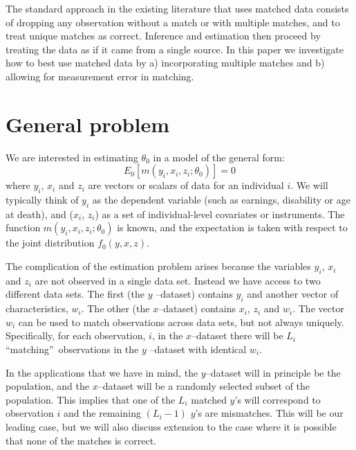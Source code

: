 \documentclass[12pt]{article}
\begin{document}
The standard approach in the existing literature that uses matched data
consists of dropping any observation without a match or with multiple
matches, and to treat unique matches as correct. Inference and estimation
then proceed by treating the data as if it came from a single source. In
this paper we investigate how to best use matched data by a) incorporating
multiple matches and b) allowing for measurement error in matching.

\section{General problem}

We are interested in estimating $\theta_0$ in a model of the general form:
\begin{equation}
E_0\left[ m\left( y_{i},x_{i},z_{i};\theta _{0}\right) \right] =0
\label{Moment}
\end{equation}%
where $y_{i}$, $x_{i}$ and $z_{i}$ are vectors or scalars of data for an
individual $i$. We will typically think of $y_{i}$ as the dependent variable
(such as earnings, disability or age at death), and ($x_{i}$, $z_{i}$) as a
set of individual-level covariates or instruments. The function $m\left(
y_{i},x_{i},z_{i};\theta _{0}\right) $ is known, and the expectation is taken with respect to the joint distribution $f_0(y,x,z)$.

The complication of the estimation problem arises because the
variables $y_{i}$, $x_{i}$ and $z_{i}$ are not observed in a single data
set. Instead we have access to two different data sets. The first (the $y$%
--dataset) contains $y_{i}$ and another vector of characteristics, $w_{i}$.
The other (the $x$--dataset) contains $x_{i}$, $z_{i}$ and $w_{i}$. The
vector $w_{i}$ can be used to match observations across data sets, but not
always uniquely.  Specifically, for each observation, $i$, in the $x$--dataset there will be $%
L_{i}$ \textquotedblleft matching\textquotedblright\ observations in the $y$%
--dataset with identical $w_{i}$. 

In the applications that we have in mind,
the $y$--dataset will in principle be the population, and the $x$--dataset will be a randomly selected subset of the population. This implies that one
of the $L_{i}$ matched $y$'s will correspond to observation $i$ and the
remaining $\left( L_{i}-1\right) $ $y$'s are mismatches. This will be our
leading case, but we will also discuss extension to the case where it is
possible that none of the matches is correct.
\end{document}
